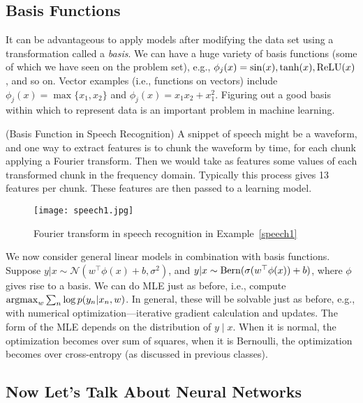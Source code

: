 \documentclass{article}
\begin{document}
\subsection{Basis Functions}

It can be advantageous to apply models after modifying the data set using a transformation called a \emph{basis}.  We can have a huge variety of basis functions (some of which we have seen on the problem set), e.g., $\phi_j(x) = \sin(x), \tanh(x), \operatorname{ReLU}(x)$, and so on. Vector examples (i.e., functions on vectors) include $\phi_j(x) = \max\{x_1, x_2\}$ and $\phi_j(x) = x_1 x_2 + x_1^2$. Figuring out a good basis within which to represent data is an important problem in machine learning.

\begin{example}
\label{speech1}

  (Basis Function in Speech Recognition) A snippet of speech might be a waveform, and one way to extract features is to chunk the waveform by time, for each chunk applying a Fourier transform. Then we would take as features some values of each transformed chunk in the frequency domain.  Typically this process gives 13 features per chunk.  These features are then passed to a learning model.
    \begin{figure}[!ht]
    \centering
    \texttt{[image: speech1.jpg]}
    \caption{Fourier transform in speech recognition in Example~\ref{speech1}}
    \end{figure}
\end{example}

We now consider general linear models in combination with basis functions. Suppose $y | x\sim\mathcal{N}(w^\top\phi(x) + b, \sigma^2)$, and $y | x\sim\operatorname{Bern}(\sigma(w^\top \phi(x)) + b)$, where $\phi$ gives rise to a basis. We can do MLE just as before, i.e., compute $\operatorname{argmax}_w \sum_n \log p(y_n | x_n, w)$. In general, these will be solvable just as before, e.g., with numerical optimization---iterative gradient calculation and updates. The form of the MLE depends on the distribution of $y \mid x$. When it is normal, the optimization becomes over sum of squares, when it is Bernoulli, the optimization becomes over cross-entropy (as discussed in previous classes).

\subsection{Now Let's Talk About Neural Networks}
\end{document}
